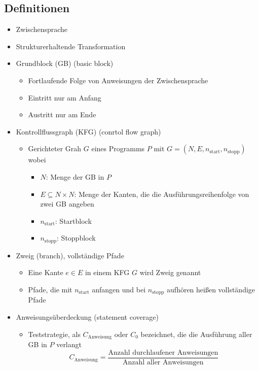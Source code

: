 \documentclass{article}
\begin{document}
\subsection{Definitionen}
\begin{itemize}
  \item Zwischensprache
  \item Strukturerhaltende Transformation
  \item Grundblock (GB) (basic block)
  \begin{itemize}
    \item Fortlaufende Folge von Anweisungen der Zwischensprache
    \item Eintritt nur am Anfang
    \item Austritt nur am Ende
  \end{itemize}
  \item Kontrollflussgraph (KFG) (conrtol flow graph)
  \begin{itemize}
    \item Gerichteter Grah $G$ eines Programms $P$ mit $G=(N,E,n_{\text{start}},n_{\text{stopp}})$ wobei
    \begin{itemize}
      \item \textit{$N$}: Menge der GB in $P$
      \item \textit{$E\subseteq N\times N$}: Menge der Kanten, die die Ausführungsreihenfolge von zwei GB angeben
      \item \textit{$n_{\text{start}}$}: Startblock
      \item \textit{$n_{\text{stopp}}$}: Stoppblock
    \end{itemize}
  \end{itemize}
  \item Zweig (branch), vollständige Pfade
  \begin{itemize}
    \item Eine Kante $e\in E$ in einem KFG $G$ wird Zweig genannt
    \item Pfade, die mit $n_{\text{start}}$ anfangen und bei $n_{\text{stopp}}$ aufhören heißen vollständige Pfade
  \end{itemize}
  \item Anweisungsüberdeckung (statement coverage)
  \begin{itemize}
    \item Teststrategie, als $C_{\text{Anweisung}}$ oder $C_0$ bezeichnet, die die Ausführung aller GB in $P$ verlangt
    \[
    C_{\text{Anweisung}}=\frac{\text{Anzahl durchlaufener Anweisungen}}{\text{Anzahl aller Anweisungen}}
\]
\end{itemize}
\end{itemize}
\end{document}
